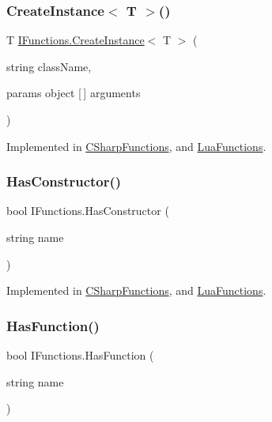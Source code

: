 \subsubsection{\texorpdfstring{Create\+Instance$<$ T $>$()}{CreateInstance< T >()}}
{\footnotesize\ttfamily T \hyperlink{interface_i_functions_a7578bf930745a057a9e24f6048858fe2}{I\+Functions.\+Create\+Instance}$<$ T $>$ (\begin{DoxyParamCaption}\item[{string}]{class\+Name,  }\item[{params object \mbox{[}$\,$\mbox{]}}]{arguments }\end{DoxyParamCaption})}



Implemented in \hyperlink{class_c_sharp_functions_a9571709a7b9247f42ebf27cac0286751}{C\+Sharp\+Functions}, and \hyperlink{class_lua_functions_a920ae8303f3acff9b271c68889ca7ee5}{Lua\+Functions}.

\mbox{\label{interface_i_functions_a41edac00a2af1290932ae95536f987f9}} 
\subsubsection{\texorpdfstring{Has\+Constructor()}{HasConstructor()}}
{\footnotesize\ttfamily bool I\+Functions.\+Has\+Constructor (\begin{DoxyParamCaption}\item[{string}]{name }\end{DoxyParamCaption})}



Implemented in \hyperlink{class_c_sharp_functions_a803d561b3e19f9b6420d4afcf5e4c631}{C\+Sharp\+Functions}, and \hyperlink{class_lua_functions_a308710875bcf9a6d4a8513029922a766}{Lua\+Functions}.

\mbox{\label{interface_i_functions_a55a472175a59db8ec3b00c5dad20cf20}} 
\subsubsection{\texorpdfstring{Has\+Function()}{HasFunction()}}
{\footnotesize\ttfamily bool I\+Functions.\+Has\+Function (\begin{DoxyParamCaption}\item[{string}]{name }\end{DoxyParamCaption})}



